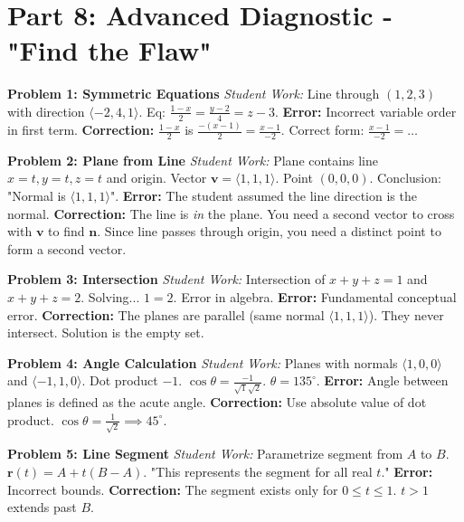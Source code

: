 \documentclass[11pt]{article}
\begin{document}
\section{Part 8: Advanced Diagnostic - "Find the Flaw"}

\textbf{Problem 1: Symmetric Equations}
\textit{Student Work:} Line through $(1, 2, 3)$ with direction $\langle -2, 4, 1 \rangle$.
Eq: $\frac{1-x}{2} = \frac{y-2}{4} = z-3$.
\textbf{Error:} Incorrect variable order in first term.
\textbf{Correction:} $\frac{1-x}{2}$ is $\frac{-(x-1)}{2} = \frac{x-1}{-2}$. Correct form: $\frac{x-1}{-2} = \dots$

\textbf{Problem 2: Plane from Line}
\textit{Student Work:} Plane contains line $x=t, y=t, z=t$ and origin.
Vector $\mathbf{v}=\langle 1,1,1 \rangle$. Point $(0,0,0)$.
Conclusion: "Normal is $\langle 1,1,1 \rangle$".
\textbf{Error:} The student assumed the line direction is the normal.
\textbf{Correction:} The line is \textit{in} the plane. You need a second vector to cross with $\mathbf{v}$ to find $\mathbf{n}$. Since line passes through origin, you need a distinct point to form a second vector.

\textbf{Problem 3: Intersection}
\textit{Student Work:} Intersection of $x+y+z=1$ and $x+y+z=2$.
Solving... $1=2$. Error in algebra.
\textbf{Error:} Fundamental conceptual error.
\textbf{Correction:} The planes are parallel (same normal $\langle 1,1,1 \rangle$). They never intersect. Solution is the empty set.

\textbf{Problem 4: Angle Calculation}
\textit{Student Work:} Planes with normals $\langle 1,0,0 \rangle$ and $\langle -1, 1, 0 \rangle$.
Dot product $-1$. $\cos \theta = \frac{-1}{\sqrt{1}\sqrt{2}}$. $\theta = 135^\circ$.
\textbf{Error:} Angle between planes is defined as the acute angle.
\textbf{Correction:} Use absolute value of dot product. $\cos \theta = \frac{1}{\sqrt{2}} \implies 45^\circ$.

\textbf{Problem 5: Line Segment}
\textit{Student Work:} Parametrize segment from $A$ to $B$. $\mathbf{r}(t) = A + t(B-A)$.
"This represents the segment for all real $t$."
\textbf{Error:} Incorrect bounds.
\textbf{Correction:} The segment exists only for $0 \le t \le 1$. $t>1$ extends past $B$.
\end{document}

